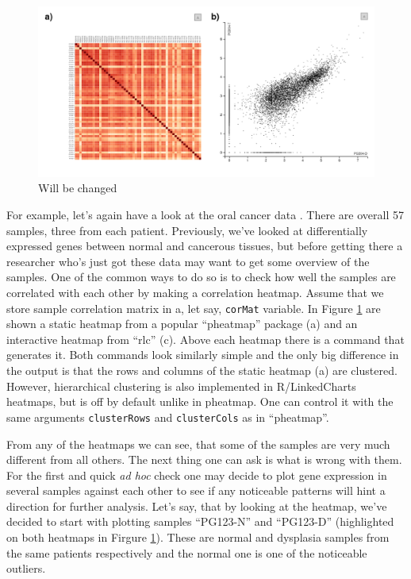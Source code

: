 \documentclass[twocolumn,10pt]{article}
\begin{document}
\begin{figure}
  \includegraphics[width=\textwidth]{FigE/figE.png}
  \caption{Will be changed}
  \label{FigE}
\end{figure}
 
For example, let's again have a look at the oral cancer data \citep{conway_2015}. There are overall 57 samples, three from each patient. Previously, we've looked at differentially expressed genes between normal and cancerous tissues, but before getting there a researcher who's just got these data may want to get some overview of the samples. One of the common ways to do so is to check how well the samples are correlated with each other by making a correlation heatmap. Assume that we store sample correlation matrix in a, let say, \texttt{corMat} variable. In Figure \ref{FigE} are shown a static heatmap from a popular ``pheatmap'' package (a) and an interactive heatmap from ``rlc'' (c). Above each heatmap there is a command that generates it. Both commands look similarly simple and the only big difference in the output is that the rows and columns of the static heatmap (a) are clustered. However, hierarchical clustering is also implemented in R/LinkedCharts heatmaps, but is off by default unlike in pheatmap. One can control it with the same arguments \texttt{clusterRows} and \texttt{clusterCols} as in ``pheatmap''.

From any of the heatmaps we can see, that some of the samples are very much different from all others. The next thing one can ask is what is wrong with them. For the first and quick \emph{ad hoc} check one may decide to plot gene expression in several samples against each other to see if any noticeable patterns will hint a direction for further analysis. Let's say, that by looking at the heatmap, we've decided to start with plotting samples ``PG123-N'' and ``PG123-D'' (highlighted on both heatmaps in Firgure \ref{FigE}). These are normal and dysplasia samples from the same patients respectively and the normal one is one of the noticeable outliers.
\end{document}
